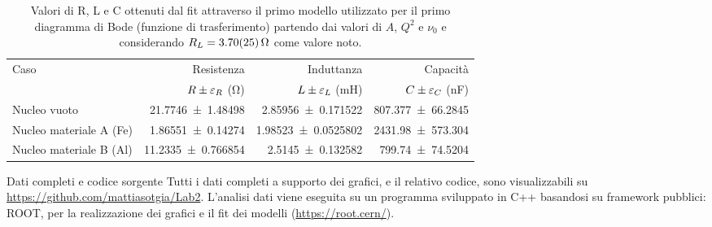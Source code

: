 \documentclass[
    prl,
    floatfix,
    reprint, 
    superscriptaddress, 
    altaffilletter, 
    amsmath, 
    amssymb, 
    a4paper]{revtex4-2}
\begin{document}

 

\begin{table}[h]
    \begin{ruledtabular}
        \caption{Valori di R, L e C ottenuti dal fit attraverso il primo modello utilizzato per il primo diagramma di Bode (funzione di trasferimento) partendo dai valori di $A$, $Q^2$ e $\nu_0$ e considerando $R_L = \SI{3.7 +- 0.25}{\ohm}$ come valore noto.}%
        \label{tab:rlc_amp_results}
        \begin{tabular}{lrrr}
            Caso & Resistenza & Induttanza & Capacità \\
            & $R\pm\varepsilon_{R}$ (\unit{\ohm}) & $L\pm\varepsilon_{L}$ (\unit{\milli\henry}) & $C\pm\varepsilon_{C}$ (\unit{\nano\farad}) \\
            \colrule
            Nucleo vuoto & \num{21.7746 +- 1.48498} & \num{2.85956 +- 0.171522} & \num[exponent-mode=scientific]{807.377 +- 66.2845} \\
            Nucleo materiale A (Fe) & \num{1.86551 +- 0.14274} & \num{1.98523 +- 0.0525802} & \num[exponent-mode=scientific]{2431.98 +- 573.304} \\
            Nucleo materiale B (Al) & \num{11.2335 +- 0.766854} & \num{2.5145 +- 0.132582} & \num[exponent-mode=scientific]{799.74 +- 74.5204}
        \end{tabular}
    \end{ruledtabular}
\end{table}










\begin{methods}{D\lowercase{ati completi e codice sorgente}}
    Tutti i dati completi a supporto dei grafici, e il relativo codice, sono visualizzabili su \url{https://github.com/mattiasotgia/Lab2}. L'analisi dati viene eseguita su un programma sviluppato in C++ basandosi su framework pubblici: ROOT, per la realizzazione dei grafici e il fit dei modelli (\url{https://root.cern/}).
\end{methods}


\appendix

\renewcommand{\thetable}{S-\arabic{table}}

\end{document}
